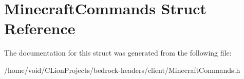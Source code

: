 \hypertarget{struct_minecraft_commands}{}\section{Minecraft\+Commands Struct Reference}
\label{struct_minecraft_commands}


The documentation for this struct was generated from the following file\+:\begin{DoxyCompactItemize}
\item 
/home/void/\+C\+Lion\+Projects/bedrock-\/headers/client/Minecraft\+Commands.\+h\end{DoxyCompactItemize}
